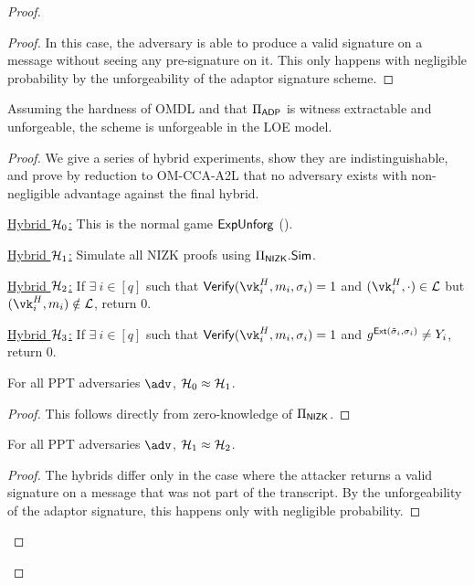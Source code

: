 \begin{proof}
\begin{proof}
        \smallskip{} In this case, the adversary is able to produce a valid signature on a message without seeing any pre-signature on it. This only happens with negligible probability by the unforgeability of the adaptor signature scheme.
        \end{proof}
        
        \begin{lemma}[Unforgeability]\label{lem:unforge}
        Assuming the hardness of OMDL and that $\Pi_{\mathsf{ADP}}$ is witness extractable and unforgeable, the \aalplus scheme is unforgeable in the LOE model.
        \end{lemma}
        
        \begin{proof}
        We give a series of hybrid experiments, show they are indistinguishable, and prove by reduction to OM-CCA-A2L that no adversary exists with non-negligible advantage against the final hybrid.
        
        \smallskip
        \noindent\underline{Hybrid $\mathcal{H}_0$:} This is the normal game $\mathsf{ExpUnforg}$ ().
        
        \smallskip
        \noindent\underline{Hybrid $\mathcal{H}_1$:} Simulate all NIZK proofs using $\Pi_{\mathsf{NIZK}}.\mathsf{Sim}$.
        
        
        \smallskip
        \noindent\underline{Hybrid $\mathcal{H}_2$:} If $\exists~i \in [q]$ such that $\vrfy(\vk_i^H,m_i,\sigma_i)=1$ and $(\vk_i^H,\cdot) \in \LL$ but $(\vk_i^H,m_i) \notin \LL$, return 0.
        
        \smallskip
        \noindent\underline{Hybrid $\mathcal{H}_3$:} If $\exists~i \in [q]$ such that $\vrfy(\vk_i^H,m_i,\sigma_i)=1$ and $g^{{\mathsf{Ext}}(\tilde\sigma_i,\sigma_i)} \neq Y_i$, return 0.
        
        \begin{claim}
        For all PPT adversaries $\adv$, $\mathcal{H}_0 \approx \mathcal{H}_1$.
        \end{claim}
        \begin{proof}
        This follows directly from zero-knowledge of $\Pi_{\mathsf{NIZK}}$.
        \end{proof}
        
        \begin{claim}
        For all PPT adversaries $\adv$, $\mathcal{H}_1 \approx \mathcal{H}_2$.
        \end{claim}
        \begin{proof}
        The hybrids differ only in the case where the attacker returns a valid signature on a message that was not part of the transcript. By the unforgeability of the adaptor signature, this happens only with negligible probability.
        \end{proof}
        

\end{proof}
\end{proof}
